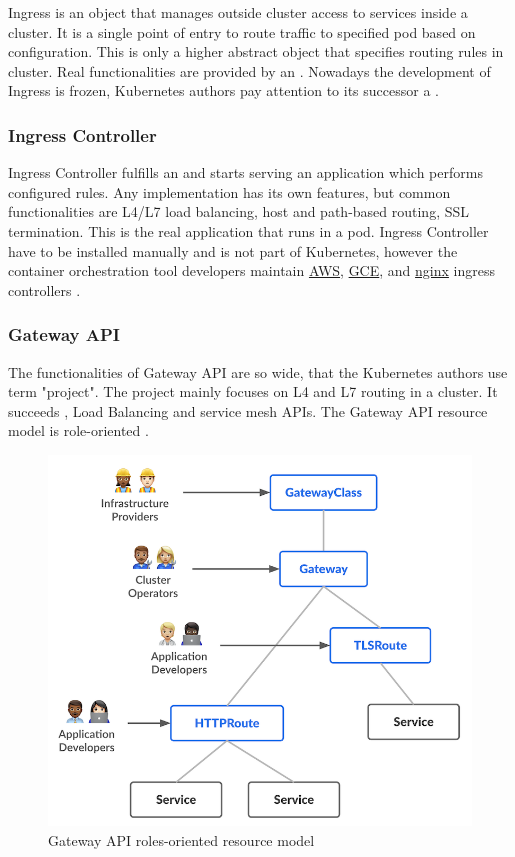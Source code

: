 Ingress is an object that manages outside cluster access to services inside a cluster. It is a single point of entry to route traffic to specified pod based on configuration. This is only a higher abstract object that specifies routing rules in cluster. Real functionalities are provided by an \textit{}. Nowadays the development of Ingress is frozen, Kubernetes authors pay attention to its successor a \textit{} \cite{KubernetesIngress}.

\subsubsection{Ingress Controller}
\label{ingresscontroller}

Ingress Controller fulfills an \textit{} and starts serving an application which performs configured rules. Any implementation has its own features, but common functionalities are L4/L7 load balancing, host and path-based routing, SSL termination. This is the real application that runs in a pod. Ingress Controller have to be installed manually and is not part of Kubernetes, however the container orchestration tool developers maintain \href{https://github.com/kubernetes-sigs/aws-load-balancer-controller#readme}{AWS}, \href{https://github.com/kubernetes/ingress-gce/blob/master/README.md#readme}{GCE}, and \href{https://github.com/kubernetes/ingress-nginx/blob/main/README.md#readme}{nginx} ingress controllers \cite{KubernetesIngress}\cite{KubernetesIngressControllers}. 


\subsubsection{Gateway API}
\label{gatewayapi}

The functionalities of Gateway API are so wide, that the Kubernetes authors use term "project". The project mainly focuses on L4 and L7 routing in a cluster. It succeeds \textit{}, Load Balancing and service mesh APIs. The Gateway API resource model is role-oriented \cite{KubernetesGatewayAPI}.

\begin{figure}[tbh]
    \centering
    \includegraphics[width=0.7\columnwidth]{images/gateway-api-resource-model.png}
    \caption{Gateway API roles-oriented resource model \cite{KubernetesGatewayAPI}}
    \label{fig:gatewayApiResourceModel}
\end{figure}

